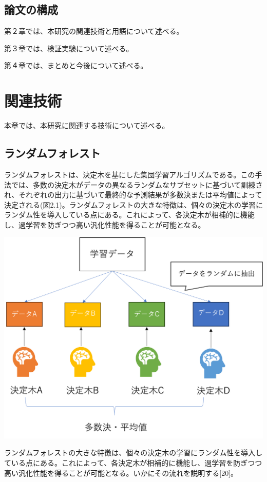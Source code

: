 \documentclass[platex]{suribt}
\begin{document}
\section{論文の構成}
第２章では、本研究の関連技術と用語について述べる。\par
第３章では、検証実験について述べる。\par
第４章では、まとめと今後について述べる。

\chapter{関連技術}
本章では、本研究に関連する技術について述べる。
\section{ランダムフォレスト}
ランダムフォレストは、決定木を基にした集団学習アルゴリズムである。この手法では、多数の決定木がデータの異なるランダムなサブセットに基づいて訓練され、それぞれの出力に基づいて最終的な予測結果が多数決または平均値によって決定される(図2.1)。ランダムフォレストの大きな特徴は、個々の決定木の学習にランダム性を導入している点にある。これによって、各決定木が相補的に機能し、過学習を防ぎつつ高い汎化性能を得ることが可能となる。

\includegraphics[scale=0.6]{randomforest.png}

ランダムフォレストの大きな特徴は、個々の決定木の学習にランダム性を導入している点にある。これによって、各決定木が相補的に機能し、過学習を防ぎつつ高い汎化性能を得ることが可能となる。いかにその流れを説明する[20]。
\end{document}
